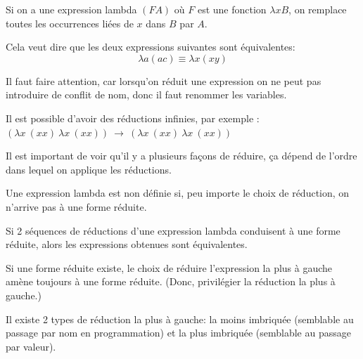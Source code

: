\begin{mydef} Si on a une expression lambda $(FA)$ où
	$F$ est une fonction $\lambda xB$, on remplace toutes les occurrences liées
	de $x$ dans $B$ par $A$.
\end{mydef}

\begin{mydef}
	Cela veut dire que les deux expressions suivantes sont équivalentes:
	$$\lambda a (a c) \equiv \lambda x (x y)$$
\end{mydef}

\begin{myrem}
	Il faut faire attention, car lorsqu'on réduit une expression on ne peut
	pas introduire de conflit de nom, donc il faut renommer les variables.
\end{myrem}

\begin{myrem}
	Il est possible d'avoir des réductions infinies, par exemple :\\
	$(\lambda x\ (xx)\ \lambda x \ (xx)) \ \rightarrow \ (\lambda x\ (xx) \
\lambda x \ (xx))$
\end{myrem}

\begin{myrem}
	Il est important de voir qu'il y a plusieurs façons de réduire, ça
	dépend de l'ordre dans lequel on applique les réductions.
\end{myrem}

\begin{myprop}
	Une expression lambda est non définie si, peu importe le choix de
	réduction, on n'arrive pas à une forme réduite.
\end{myprop}

\begin{mytheo} Si 2 séquences de réductions d'une expression
	lambda conduisent à une forme réduite, alors les expressions obtenues
	sont équivalentes.
\end{mytheo}

\begin{myprop}
	Si une forme réduite existe, le choix de réduire l'expression la plus à
	gauche amène toujours à une forme réduite. (Donc, privilégier la
	réduction la plus à gauche.)
\end{myprop}

\begin{myrem}
	Il existe 2 types de réduction la plus à gauche: la moins imbriquée
	(semblable au passage par nom en programmation) et la plus imbriquée
	(semblable au passage par valeur).
\end{myrem}

